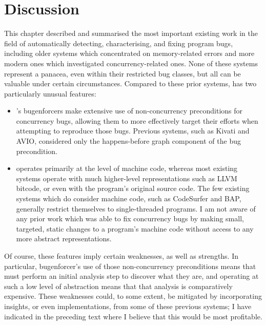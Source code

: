 \section{Discussion}


\noindent
This chapter described and summarised the most important existing work
in the field of automatically detecting, characterising, and fixing
program bugs, including older systems which concentrated on
memory-related errors and more modern ones which investigated
concurrency-related ones.  None of these systems represent a panacea,
even within their restricted bug classes, but all can be valuable
under certain circumstances.  Compared to these prior systems,
{\technique} has two particularly unusual features:
\begin{itemize}
\item {\Technique}'s \glspl{bugenforcer} make extensive use of
  non-concurrency preconditions for concurrency bugs, allowing them to
  more effectively target their efforts when attempting to reproduce
  those bugs.  Previous systems, such as Kivati and AVIO, considered
  only the happens-before graph component of the bug precondition.
\item {\Technique} operates primarily at the level of machine code,
  whereas most existing systems operate with much higher-level
  representations such as LLVM bitcode, or even with the program's
  original source code.  The few existing systems which do consider
  machine code, such as CodeSurfer and BAP, generally restrict
  themselves to single-threaded programs.  I am not aware of any prior
  work which was able to fix concurrency bugs by making small,
  targeted, static changes to a program's machine code without access
  to any more abstract representations.
\end{itemize}
Of course, these features imply certain weaknesses, as well as
strengths.  In particular, \gls{bugenforcer}'s use of those
non-concurrency preconditions means that {\technique} must perform an
initial analysis step to discover what they are, and operating at such
a low level of abstraction means that that analysis is comparatively
expensive.  These weaknesses could, to some extent, be mitigated by
incorporating insights, or even implementations, from some of these
previous systems; I have indicated in the preceding text where I
believe that this would be most profitable.

